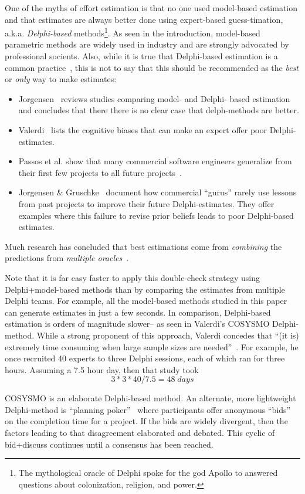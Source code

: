 \documentclass{sig-alternate}
\newcommand{\bi}{\begin{itemize}[leftmargin=0.4cm]}
\newcommand{\ei}{\end{itemize}}
\newenvironment{changed}{\par\color{MyDarkBlue}}{\par}
\begin{document}
\begin{changed}
One of the myths of effort estimation is that no one used model-based estimation and that
estimates are always better done using expert-based guess-timation, a.k.a. {\em Delphi-based} methods\footnote{The mythological oracle of Delphi spoke for the god Apollo to answered questions  about colonization, religion, and power.}.
As seen in the introduction, model-based
parametric methods are  widely used in industry and
are strongly advocated by professional socients.
Also, 
while it is true that Delphi-based estimation is a common practice~\cite{boehm00a}, this is not to say that this should be recommended as the {\em best} or {\em only} way to make estimates:
\bi 
\item
Jorgensen~\cite{Jorgensen2004} reviews studies 
comparing  model- and Delphi- based estimation and concludes that there
there is no clear case that delph-methods are better.
\item 
Valerdi~\cite{valerdi11} lists the
cognitive biases that can make an expert offer poor Delphi-estimates.
\item Passos et al. show that many
commercial software engineers generalize from their
first few projects to all future
projects~\cite{passos11}.
\item
Jorgensen \& Gruschke~\cite{jorgensen09} document how
  commercial  ``gurus'' rarely use lessons
  from past projects to improve their future Delphi-estimates. 
 They offer examples where this
  failure to revise prior beliefs   leads to poor
 Delphi-based estimates.
  \ei 
Much research has concluded that best    estimations come from {\em combining} the predictions
from {\em multiple oracles}~\cite{koc11a,chulani99,baker07,valerdi11}.  

Note that it is far easy faster to apply this double-check strategy using Delphi+model-based methods 
than by comparing the estimates from multiple Delphi teams.
For example, all the model-based methods  studied in this paper can generate estimates
in just a few seconds. In comparison, Delphi-based estimation is orders of magnitude slower-- as seen in  
Valerdi's  
COSYSMO Delphi-method.
While a strong proponent of this approach, Valerdi concedes that 
``(it is)  extremely time
consuming when large sample sizes are needed''~\cite{valerdi11}.
For example, he once
recruited 40 experts to three Delphi sessions, each of which ran for three hours.
Assuming a 7.5 hour day,
then that study took \[3*3*40 /7.5 = 48\; \mathit{days}\]

COSYSMO is an elaborate Delphi-based method. An alternate, more lightweight Delphi-method is  ``planning poker''~\cite{molokk08} where
participants offer anonymous
``bids'' on the 
completion time for a project. If  the bids are widely divergent, then the factors
leading to that disagreement elaborated and debated. This cyclic of bid+discuss continues
until a consensus has been reached.


\end{changed}
\end{document}
